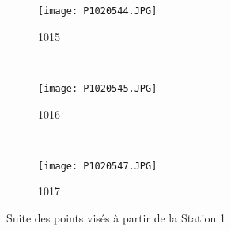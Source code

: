 \begin{figure}[!h]
    \centering
    \begin{subfigure}[b]{0.3\textwidth}
        \texttt{[image: P1020544.JPG]}
        \caption{1015}%
        \label{P1020544}
    \end{subfigure}
    ~
    \begin{subfigure}[b]{0.3\textwidth}
        \texttt{[image: P1020545.JPG]}
        \caption{1016}%
        \label{P1020545}
    \end{subfigure}
    ~
    \begin{subfigure}[b]{0.3\textwidth}
        \texttt{[image: P1020547.JPG]}
        \caption{1017}%
        \label{P1020547}
    \end{subfigure}
    \caption{Suite des points visés à partir de la Station 1}
    \label{Points Cibles S1b}
\end{figure}



